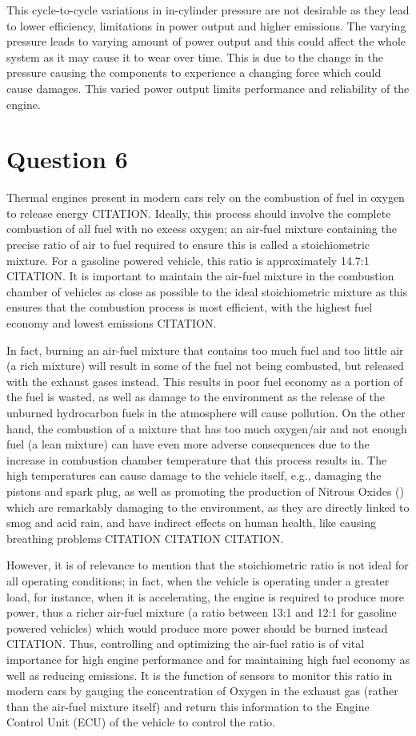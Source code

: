\documentclass[11pt]{article}
\begin{document}
This cycle-to-cycle variations in in-cylinder pressure are not desirable as they lead to lower efficiency, limitations in power output and higher emissions. The varying pressure leads to varying amount of power output and this could affect the whole system as it may cause it to wear over time. This is due to the change in the pressure causing the components to experience a changing force which could cause damages. This varied power output limits performance and reliability of the engine.  
\section{Question 6}
Thermal engines present in modern cars rely on the combustion of fuel in oxygen to release energy CITATION. Ideally, this process should involve the complete combustion of all fuel with no excess oxygen; an air-fuel mixture containing the precise ratio of air to fuel required to ensure this is called a stoichiometric mixture. For a gasoline powered vehicle, this ratio is approximately 14.7:1 CITATION. It is important to maintain the air-fuel mixture in the combustion chamber of vehicles as close as possible to the ideal stoichiometric mixture as this ensures that the combustion process is most efficient, with the highest fuel economy and lowest emissions CITATION.

In fact, burning an air-fuel mixture that contains too much fuel and too little air (a rich mixture) will result in some of the fuel not being combusted, but released with the exhaust gases instead. This results in poor fuel economy as a portion of the fuel is wasted, as well as damage to the environment as the release of the unburned hydrocarbon fuels in the atmosphere will cause pollution. On the other hand, the combustion of a mixture that has too much oxygen/air and not enough fuel (a lean mixture) can have even more adverse consequences due to the increase in combustion chamber temperature that this process results in. The high temperatures can cause damage to the vehicle itself, e.g., damaging the pistons and spark plug, as well as promoting the production of Nitrous Oxides ()  which are remarkably damaging to the environment, as they are directly linked to smog and acid rain, and have indirect effects on human health, like causing breathing problems CITATION CITATION CITATION.

However, it is of relevance to mention that the stoichiometric ratio is not ideal for all operating conditions; in fact, when the vehicle is operating under a greater load, for instance, when it is accelerating, the engine is required to produce more power, thus a richer air-fuel mixture (a ratio between 13:1 and 12:1 for gasoline powered vehicles) which would produce more power should be burned instead CITATION. Thus, controlling and optimizing the air-fuel ratio is of vital importance for high engine performance and for maintaining high fuel economy as well as reducing emissions. It is the function of  sensors to monitor this ratio in modern cars by gauging the concentration of Oxygen in the exhaust gas (rather than the air-fuel mixture itself) and return this information to the Engine Control Unit (ECU) of the vehicle to control the ratio. 
\end{document}
